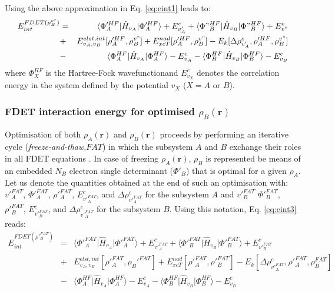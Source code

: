 \documentclass[journal=jctcce,manuscript=article]{achemso}
\begin{document}
Using the above approximation in Eq. \ref{eq:eint1} leads to:
 \begin{eqnarray}
E_{int}^{FDET(\rho_B^{v"})} 
&=&  \langle\Phi'^{HF}_{A}\vert \hat{H}_{v_A}\vert \Phi'^{HF}_{A}\rangle + E^{c}_{v'_A} + \langle\Phi"^{HF}_{B}\vert \hat{H}_{v_B}\vert \Phi"^{HF}_{B}\rangle  + E^{c}_{v"} \label{eq:eint3}\\ \nonumber
&+& E^{elst,int}_{v_A,v_B}[\rho'^{HF}_A,\rho_B^{v"}] + {E}_{xcT}^{nad}[\rho'^{HF}_A,\rho_B^{v"}]-     E_k[\Delta \rho^{c}_{v'_A}, \rho'^{HF}_A, \rho_B^{v"}]  \nonumber\\
&-& 
\langle\Phi^{HF}_{A}\vert \hat{H}_{v_A}\vert \Phi^{HF}_{A}\rangle - E^{c}_{v_A}
- \langle\Phi^{HF}_{B}\vert \hat{H}_{v_B}\vert \Phi^{HF}_{B}\rangle - E^{c}_{v_B}\nonumber
\end{eqnarray}
where $\Phi^{HF}_{X}$ is the Hartree-Fock wavefunctionand  $E^{c}_{v_X}$ denotes the correlation energy in the system defined by the potential $v_X$ ($X=A$ or $B$).
 \subsubsection{FDET interaction energy for  optimised $\rho_B(\mathbf{r})$}
Optimisation of both $\rho_A(\mathbf{r})$ and $\rho_B(\mathbf{r})$  proceeds by performing an iterative cycle (\textit{freeze-and-thaw},$FAT$) in which the
subsystem $A$ and $B$ exchange their roles  in all FDET equations \cite{Wesolowski1996a}. 
In case of freezing $\rho_A(\mathbf{r})$,  $\rho_B$ is represented be means of an embedded $N_B$ electron single determinant ($\Phi'_B$) that is optimal  for a given $\rho_A$. Let us denote the quantities obtained at the end of such an optimisation with: $v'^{FAT}_A$, $\Phi'^{FAT}_A$, $\rho'^{FAT}_A$, 
 $E^{c}_{v'^{FAT}_A}$, and $\Delta \rho^{c}_{v'^{FAT}_A}$  for the subsystem $A$ and
 $v'^{FAT}_B$ $\Phi'^{FAT}_B$, $\rho'^{FAT}_B$, 
 $E^{c}_{v'^{FAT}_B}$, and $\Delta \rho^{c}_{v'^{FAT}_A}$  for the subsystem $B$. Using this notation, Eq. \ref{eq:eint3} reads: 
 \begin{eqnarray}
E_{int}^{FDET(\rho'^{FAT}_B)} 
&=&  \langle\Phi'^{FAT}_{A}\vert \hat{H}_{v_A}\vert \Phi'^{FAT}_{A}\rangle + E^{c}_{v'^{FAT}_A} + \langle\Phi'^{FAT}_{B}\vert \hat{H}_{v_B}\vert \Phi'^{FAT}_{B}\rangle  + E^{c}_{v'^{FAT}_B} \label{eq:eint4A}\\ \nonumber
&+& E^{elst,int}_{v_A,v_B}[\rho'^{FAT}_A,\rho_B'^{FAT}] + {E}_{xcT}^{nad}[\rho'^{FAT}_A,\rho'^{FAT}_B]-     E_k[\Delta \rho^{c}_{v'^{FAT}_A}, \rho'^{FAT}_A, \rho^{FAT}_B]  \nonumber\\
&-& 
\langle\Phi^{HF}_{A}\vert \hat{H}_{v_A}\vert \Phi^{HF}_{A}\rangle - E^{c}_{v_A}
- \langle\Phi^{HF}_{B}\vert \hat{H}_{v_B}\vert \Phi^{HF}_{B}\rangle - E^{c}_{v_B}\nonumber
\end{eqnarray}
\end{document}
